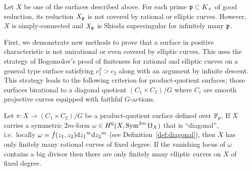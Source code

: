 \documentclass[main.tex]{subfiles}
\begin{document}
\begin{thm} \label{intro:thm:example}
Let $X$ be one of the surfaces described above. For each prime $\mathfrak{p} \subset K_+$ of good reduction, its reduction $X_{\mathfrak{p}}$ is not covered by rational or elliptic curves. However, $X$ is simply-connected and $X_{\mathfrak{p}}$ is Shioda supersingular for infinitely many $\mathfrak{p}$.
\end{thm}

First, we demonstrate new methods to prove that a surface in positive characteristic is not unirational or even covered by elliptic curves. This uses the strategy of Bogomolov's proof \cite{bogomolov:families_curves} of finiteness for rational and elliptic curves on a general type surface satisfying $c_1^2 > c_2$ along with an argument by infinite descent. This strategy leads to the following criterion for product-quotient surfaces, those surfaces birational to a diagonal quotient $(C_1 \times C_2) / G$ where $C_i$ are smooth projective curves equipped with faithful $G$-actions.

\begin{thm} \label{intro:thm:criterion}
Let $\pi : X \to (C_1 \times C_2)/G$ be a product-quotient surface defined over $\mathbb{F}_p$. If $X$ carries a symmetric $2m$-form $\omega \in H^0(X, \operatorname{\mathrm{Sym}}^{2m} \Omega_X)$ that is ``diagonal'', i.e.\ locally $\omega = f(z_1, z_2) \mathrm{d}{z_1}^m \mathrm{d}{z_2}^m$ (see Definition~\ref{def:diagonal}), then $X$ has only finitely many rational curves of fixed degree. If the vanishing locus of $\omega$ contains a big divisor then there are only finitely many elliptic curves on $X$ of fixed degree.
\end{thm}
\end{document}
